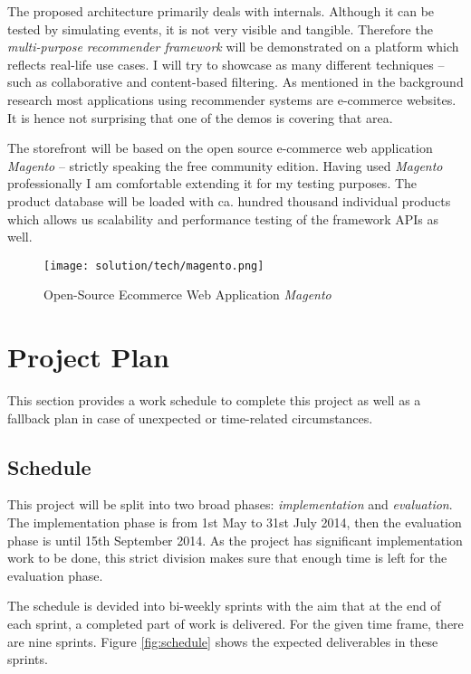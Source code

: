 The proposed architecture primarily deals with internals. Although it can be tested by simulating events, it is not very visible and tangible. Therefore the \emph{multi-purpose recommender framework} will be demonstrated on a platform which reflects real-life use cases. I will try to showcase as many different techniques -- such as collaborative and content-based filtering. As mentioned in the background research most applications using recommender systems are e-commerce websites. It is hence not surprising that one of the demos is covering that area.

The storefront will be based on the open source e-commerce web application \emph{Magento} -- strictly speaking the free community edition. Having used \emph{Magento} professionally I am comfortable extending it for my testing purposes. The product database will be loaded with ca. hundred thousand individual products which allows us scalability and performance testing of the framework APIs as well.

\begin{figure}[ht]
    \texttt{[image: solution/tech/magento.png]}
    \caption{Open-Source Ecommerce Web Application \emph{Magento}}
    \label{fig:magento}
\end{figure}



\chapter{Project Plan}

This section provides a work schedule to complete this project as well as a fallback plan in case of unexpected or time-related circumstances.

\section{Schedule}

This project will be split into two broad phases: \emph{implementation} and \emph{evaluation}. The implementation phase is from 1st May to 31st July 2014, then the evaluation phase is until 15th September 2014. As the project has significant implementation work to be done, this strict division makes sure that enough time is left for the evaluation phase.

The schedule is devided into bi-weekly sprints with the aim that at the end of each sprint, a completed part of work is delivered. For the given time frame, there are nine sprints. Figure \ref{fig:schedule} shows the expected deliverables in these sprints.

